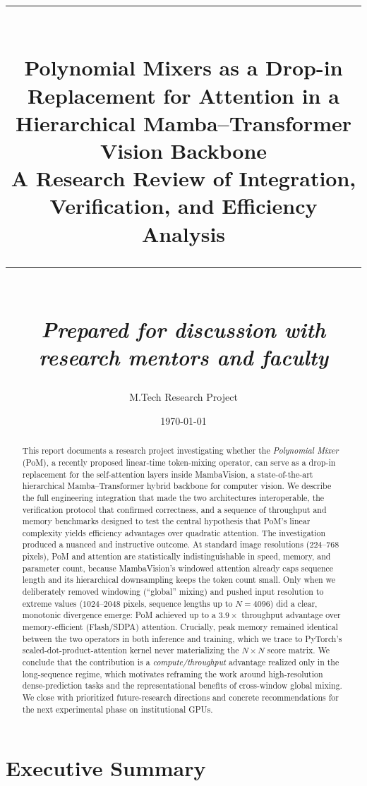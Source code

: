 \documentclass[11pt,a4paper]{article}
\title{
    \vspace{-1.5cm}
    \rule{\textwidth}{1pt}\\[0.4cm]
    {\Huge \bfseries Polynomial Mixers as a Drop-in Replacement for Attention in a Hierarchical Mamba--Transformer Vision Backbone}\\[0.3cm]
    {\Large A Research Review of Integration, Verification, and Efficiency Analysis}\\[0.3cm]
    \rule{\textwidth}{1pt}\\[0.3cm]
    {\large \textit{Prepared for discussion with research mentors and faculty}}
}
\author{M.Tech Research Project}
\date{\today}
\begin{document}
\maketitle
\thispagestyle{empty}

\begin{abstract}
\noindent
This report documents a research project investigating whether the \emph{Polynomial Mixer} (PoM), a recently proposed linear-time token-mixing operator, can serve as a drop-in replacement for the self-attention layers inside MambaVision, a state-of-the-art hierarchical Mamba--Transformer hybrid backbone for computer vision. We describe the full engineering integration that made the two architectures interoperable, the verification protocol that confirmed correctness, and a sequence of throughput and memory benchmarks designed to test the central hypothesis that PoM's linear complexity yields efficiency advantages over quadratic attention. The investigation produced a nuanced and instructive outcome. At standard image resolutions ($224$--$768$ pixels), PoM and attention are statistically indistinguishable in speed, memory, and parameter count, because MambaVision's windowed attention already caps sequence length and its hierarchical downsampling keeps the token count small. Only when we deliberately removed windowing (``global'' mixing) and pushed input resolution to extreme values ($1024$--$2048$ pixels, sequence lengths up to $N=4096$) did a clear, monotonic divergence emerge: PoM achieved up to a $3.9\times$ throughput advantage over memory-efficient (Flash/SDPA) attention. Crucially, peak memory remained identical between the two operators in both inference and training, which we trace to PyTorch's scaled-dot-product-attention kernel never materializing the $N\times N$ score matrix. We conclude that the contribution is a \emph{compute/throughput} advantage realized only in the long-sequence regime, which motivates reframing the work around high-resolution dense-prediction tasks and the representational benefits of cross-window global mixing. We close with prioritized future-research directions and concrete recommendations for the next experimental phase on institutional GPUs.
\end{abstract}

\tableofcontents
\newpage

\section{Executive Summary}
\end{document}
